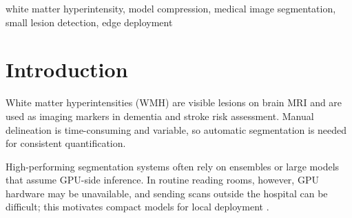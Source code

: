 \documentclass[conference]{IEEEtran}
\begin{document}
\begin{abstract}
Deploying white matter hyperintensity (WMH) segmentation on machines
without GPUs motivates model compression. When a 1.98\,M-parameter U-Net
is reduced to 0.12\,M parameters, DSC falls by only 0.016, but
small-lesion recall falls by 0.197, showing that DSC hides a much larger
loss. We compare four compression families and an attention variant at a
matched parameter budget using lesion-size-stratified recall. Removing
the deepest U-Net stage gives the highest small-lesion recall (0.479) of the
compression families, not significantly different from a four-times-larger
model, with DSC close to the uncompressed baseline. This gain costs 3.4
times the MACs of uniform width scaling; at matched compute (and one quarter
of the parameters), the recall gain is offset by lower lesion precision. Compression studies for WMH segmentation
should therefore report lesion-size-stratified recall alongside DSC.
\end{abstract}

\begin{IEEEkeywords}
white matter hyperintensity, model compression, medical image
segmentation, small lesion detection, edge deployment
\end{IEEEkeywords}

\section{Introduction}

White matter hyperintensities (WMH) are visible lesions on brain MRI and
are used as imaging markers in dementia and stroke risk assessment.
Manual delineation is time-consuming and variable, so automatic
segmentation is needed for consistent quantification.

High-performing segmentation systems often rely on ensembles or large
models that assume GPU-side inference. In routine reading rooms, however,
GPU hardware may be unavailable, and sending scans outside the hospital
can be difficult; this motivates compact models for local deployment
\cite{zhu2022vbnet,mahe2026strokeseg,lan2026kd}.
\end{document}

